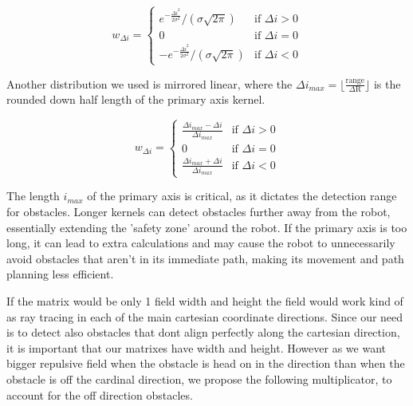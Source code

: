 \documentclass[letterpaper, 10 pt, conference]{ieeeconf}  %
\begin{document}
\begin{equation}
w_{\Delta i} = 
\begin{cases} 
	e^{-\frac{\Delta i^2}{2\sigma^2}} / (\sigma \sqrt{2\pi}) & \text{if } \Delta i > 0 \\
	0 & \text{if } \Delta i = 0 \\
	-e^{-\frac{\Delta i^2}{2\sigma^2}} / (\sigma \sqrt{2\pi}) & \text{if } \Delta i < 0 
\end{cases}
\end{equation}


Another distribution we used is mirrored linear, where the $\Delta i_{max} = \lfloor \frac{\mathrm{range}}{\Delta \mathrm{R}} \rfloor$ is the rounded down half length of the primary axis kernel. 

\begin{equation}
	w_{\Delta i} = 
	\begin{cases} 
	 	\frac{\Delta i_{max} - \Delta i}{\Delta i_{max}} & \text{if } \Delta i > 0 \\
		0 & \text{if } \Delta i = 0 \\
		\frac{\Delta i_{max} + \Delta i}{\Delta i_{max}}& \text{if } \Delta i < 0 
	\end{cases}
\end{equation}

The length $i_{max}$ of the primary axis is critical, as it dictates the detection range for obstacles. Longer kernels can detect obstacles further away from the robot, essentially extending the ’safety zone’ around the robot. If the primary axis is too long, it can lead to extra calculations and may cause the robot to unnecessarily avoid obstacles that aren't in its immediate path, making its movement and path planning less efficient. 



If the matrix would be only 1 field width and height the field would work kind of as ray tracing in each of the main cartesian coordinate directions. Since our need is to detect also obstacles that dont align perfectly along the cartesian direction, it is important that our matrixes have width and height. However as we want bigger repulsive field when the obstacle is head on in the direction than when the obstacle is off the cardinal direction, we propose the following multiplicator, to account for the off direction obstacles.
\end{document}
